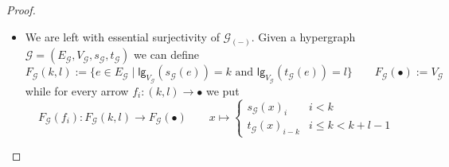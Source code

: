 \documentclass[3p]{elsarticle}
\newcommand{\lgh}{\mathsf{lg}}
\newcommand{\catname}[1]{\textbf{\textup{#1}}}
\theoremstyle{remark}
\theoremstyle{definition}
\begin{document}
\begin{proof}
\begin{itemize}
		 Now, let $f_i\colon (k,l)\to \bullet$ be an arrow in $\catname{H}$. We have two cases
		 \begin{itemize}
		 	\item if $i<k$ then 
		 	\[\eta_{\bullet}\circ F(f_i) = g\circ F(f_i) = g\circ \pi^F_{k, i}\circ s^F_{k,l}= \pi^G_{k,i}\circ g^k\circ s^F_{k,l} = \pi^G_{k,i} \circ s^G_{k,l}\circ \eta_{(k,l)} = G(f_i)\circ \eta_{(k,l)}  \]
		 	\item if $k\leq i < k+l-1$ then
		 	\[\eta_{\bullet} \circ F(f_i) = g\circ F(f_i) = g\circ \pi^F_{l, i-k} \circ t^{F}_{k,l} = \pi^G_{l, i-k}\circ g^l \circ t^F_{k,l}= \pi^G_{k, i-k}\circ t^G_{k,l}\circ \eta_{(k,l)} = G(f_i)\circ \eta_{(k,l)}\]
		 \end{itemize}
		 
	By construction $f_{k,l}= \iota^G_{k,l} \circ \eta_{(k,l)}$ and so $(\hat{\eta}, \eta_{\bullet})=(f,g)$ as wanted. 
	
		\item We are left with essential surjectivity of $\mathcal{G}_{(-)}$. Given a hypergraph $\mathcal{G}=(E_\mathcal{G}, V_\mathcal{G}, s_\mathcal{G}, t_\mathcal{G})$ we can define 
		\[	F_{\mathcal{G}}(k,l):=\{e\in E_{\mathcal{G}} \mid \lgh_{V_{\mathcal{G}}}(s_{{\mathcal{G}}}(e)) = k \text{ and } \lgh_{V_{\mathcal{G}}}(t_{{\mathcal{G}}}(e)) = l \} \qquad F_{\mathcal{G}}(\bullet):=V_\mathcal{G}\]
		while for every arrow $f_i\colon (k,l)\to \bullet$ we put
		\[F_{\mathcal{G}}(f_i)\colon F_{\mathcal{G}}(k,l)\to F_{\mathcal{G}}(\bullet) \qquad x\mapsto \begin{cases}
			s_\mathcal{G}(x)_i& i<k\\
			t_\mathcal{G}(x)_{i-k} &i\leq k < k+l-1
		\end{cases}  \]
		 

\end{itemize}
\end{proof}
\end{document}
